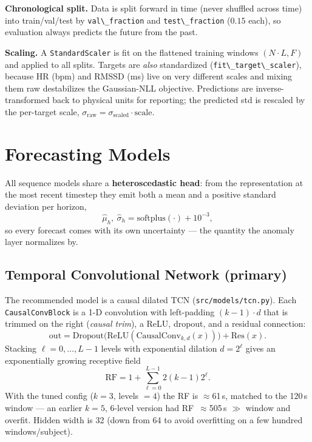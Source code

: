 \documentclass[11pt,a4paper]{article}
\newcommand{\code}[1]{\lstinline[basicstyle=\ttfamily\normalsize]!#1!}
\begin{document}
\textbf{Chronological split.} Data is split forward in time (never shuffled
across time) into train/val/test by \code{val\_fraction} and
\code{test\_fraction} ($0.15$ each), so evaluation always predicts the future
from the past.

\textbf{Scaling.} A \code{StandardScaler} is fit on the flattened training
windows $(N\!\cdot\!L, F)$ and applied to all splits. Targets are
\emph{also} standardized (\code{fit\_target\_scaler}), because HR (bpm) and RMSSD
(ms) live on very different scales and mixing them raw destabilizes the
Gaussian-NLL objective. Predictions are inverse-transformed back to physical
units for reporting; the predicted std is rescaled by the per-target scale,
$\sigma_{\text{raw}}=\sigma_{\text{scaled}}\cdot\text{scale}$.

\section{Forecasting Models}\label{sec:models}

All sequence models share a \textbf{heteroscedastic head}: from the
representation at the most recent timestep they emit both a mean and a positive
standard deviation per horizon,
\[
\hat\mu_h,\ \hat\sigma_h=\text{softplus}(\cdot)+10^{-3},
\]
so every forecast comes with its own uncertainty --- the quantity the anomaly
layer normalizes by.

\subsection{Temporal Convolutional Network (primary)}
The recommended model is a causal dilated TCN (\code{src/models/tcn.py}). Each
\code{CausalConvBlock} is a 1-D convolution with left-padding
$(k-1)\cdot d$ that is trimmed on the right (\emph{causal trim}), a ReLU,
dropout, and a residual connection:
\[
\text{out}=\text{Dropout}\big(\text{ReLU}(\text{CausalConv}_{k,d}(x))\big)+\text{Res}(x).
\]
Stacking $\ell=0,\dots,L{-}1$ levels with exponential dilation $d=2^\ell$ gives an
exponentially growing receptive field
\[
\text{RF}=1+\sum_{\ell=0}^{L-1}2(k-1)2^{\ell}.
\]
With the tuned config ($k=3$, levels $=4$) the RF is $\approx$61\,s, matched to the
120\,s window --- an earlier $k=5$, 6-level version had RF~$\approx$505\,s
$\gg$ window and overfit. Hidden width is 32 (down from 64 to avoid overfitting
on a few hundred windows/subject).
\end{document}
